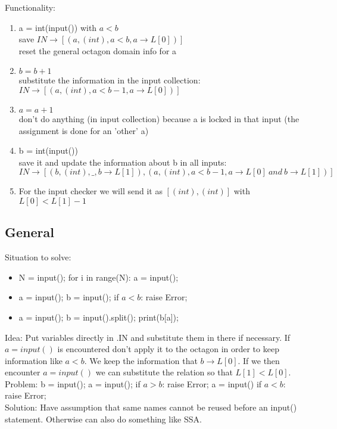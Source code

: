 \documentclass[11pt]{article}
\begin{document}
Functionality:
\begin{enumerate}
  \item a = int(input()) with $a < b$\\
  save $IN \rightarrow [(a, (int), a < b, a \rightarrow L[0])]$\\
  reset the general octagon domain info for a
  \item $b = b + 1$\\
  substitute the information in the input collection: $IN \rightarrow [(a, (int), a < b - 1, a \rightarrow L[0])]$
  \item $a = a + 1$\\
  don't do anything (in input collection) because a is locked in that input (the assignment is done for an 'other' a)
  \item b = int(input())\\
  save it and update the information about b in all inputs:\\
  $IN \rightarrow [(b, (int), \_, b \rightarrow L[1]), (a, (int), a < b - 1, a \rightarrow L[0]\:and\:b \rightarrow L[1])]$
  \item For the input checker we will send it as $[(int), (int)]$ with $L[0] < L[1] - 1$
\end{enumerate}

\subsection{General}

Situation to solve:
\begin{itemize}
  \item N = input(); for i in range(N): a = input();
  \item a = input(); b = input(); if $a < b$: raise Error;
  \item a = input(); b = input().split(); print(b[a]);
\end{itemize}


Idea: Put variables directly in .IN and substitute them in there if necessary. If $a = input()$ is encountered don't apply it to the octagon in order to keep information like $a < b$. We keep the information that $b \rightarrow L[0]$. If we then encounter $a = input()$ we can substitute the relation so that $L[1] < L[0]$.\\
Problem: b = input(); a = input(); if $a > b$: raise Error; a = input() if $a < b$: raise Error;\\
Solution: Have assumption that same names cannot be reused before an input() statement. Otherwise can also do something like SSA.\\
\end{document}
